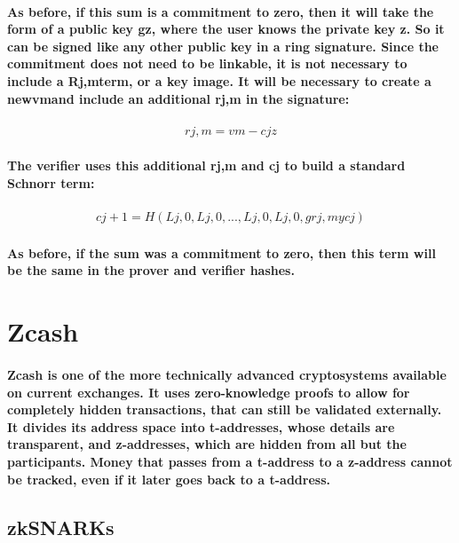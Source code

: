 \documentclass{article}
\begin{document}
\paragraph{As before, if this sum is a commitment to zero, then it will take the form of a public key gz, where the user knows the private key z.  So it can be signed like any other public key in a ring signature.  Since the commitment does not need to be linkable, it is not necessary to include a Rj,mterm, or a key image.  It will be necessary to create a newvmand include an additional rj,m in the signature:}

\begin{eqnarray}
  rj,m=vm-cjz
\end{eqnarray}

\paragraph{The verifier uses this additional rj,m and cj to build a standard Schnorr term:}

\begin{eqnarray}
  cj+1=H(Lj,0, Lj,0, ... , Lj,0, Lj,0, grj,m ycj)
\end{eqnarray}

\paragraph{As before, if the sum was a commitment to zero, then this term will be the same in the prover and verifier hashes.}



\section{Zcash}

\paragraph{Zcash is one of the more technically advanced cryptosystems available on current exchanges.  It uses zero-knowledge proofs to allow for completely hidden transactions, that can still be validated externally.  It divides its address space into t-addresses, whose details are transparent, and z-addresses, which are hidden from all but the participants.  Money that passes from a t-address to a z-address cannot be tracked, even if it later goes back to a t-address.}


\subsection{zkSNARKs}
\end{document}
